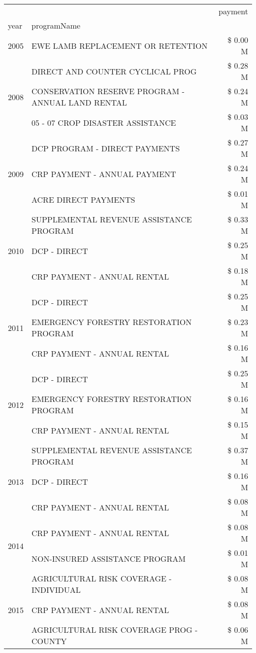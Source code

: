 \begin{tabular}{llr}
\toprule
 &  & payment \\
year & programName &  \\
\midrule
2005 & EWE LAMB REPLACEMENT OR RETENTION & \$ 0.00 M \\
\cline{1-3}
\multirow[t]{3}{*}{2008} & DIRECT AND COUNTER CYCLICAL PROG & \$ 0.28 M \\
 & CONSERVATION RESERVE PROGRAM - ANNUAL LAND RENTAL & \$ 0.24 M \\
 & 05 - 07 CROP DISASTER ASSISTANCE & \$ 0.03 M \\
\cline{1-3}
\multirow[t]{3}{*}{2009} & DCP PROGRAM - DIRECT PAYMENTS & \$ 0.27 M \\
 & CRP PAYMENT - ANNUAL PAYMENT & \$ 0.24 M \\
 & ACRE DIRECT PAYMENTS & \$ 0.01 M \\
\cline{1-3}
\multirow[t]{3}{*}{2010} & SUPPLEMENTAL REVENUE ASSISTANCE PROGRAM & \$ 0.33 M \\
 & DCP - DIRECT & \$ 0.25 M \\
 & CRP PAYMENT - ANNUAL RENTAL & \$ 0.18 M \\
\cline{1-3}
\multirow[t]{3}{*}{2011} & DCP - DIRECT & \$ 0.25 M \\
 & EMERGENCY FORESTRY RESTORATION PROGRAM & \$ 0.23 M \\
 & CRP PAYMENT - ANNUAL RENTAL & \$ 0.16 M \\
\cline{1-3}
\multirow[t]{3}{*}{2012} & DCP - DIRECT & \$ 0.25 M \\
 & EMERGENCY FORESTRY RESTORATION PROGRAM & \$ 0.16 M \\
 & CRP PAYMENT - ANNUAL RENTAL & \$ 0.15 M \\
\cline{1-3}
\multirow[t]{3}{*}{2013} & SUPPLEMENTAL REVENUE ASSISTANCE PROGRAM & \$ 0.37 M \\
 & DCP - DIRECT & \$ 0.16 M \\
 & CRP PAYMENT - ANNUAL RENTAL & \$ 0.08 M \\
\cline{1-3}
\multirow[t]{2}{*}{2014} & CRP PAYMENT - ANNUAL RENTAL & \$ 0.08 M \\
 & NON-INSURED ASSISTANCE PROGRAM & \$ 0.01 M \\
\cline{1-3}
\multirow[t]{3}{*}{2015} & AGRICULTURAL RISK COVERAGE - INDIVIDUAL & \$ 0.08 M \\
 & CRP PAYMENT - ANNUAL RENTAL & \$ 0.08 M \\
 & AGRICULTURAL RISK COVERAGE PROG - COUNTY & \$ 0.06 M \\

\end{tabular}
